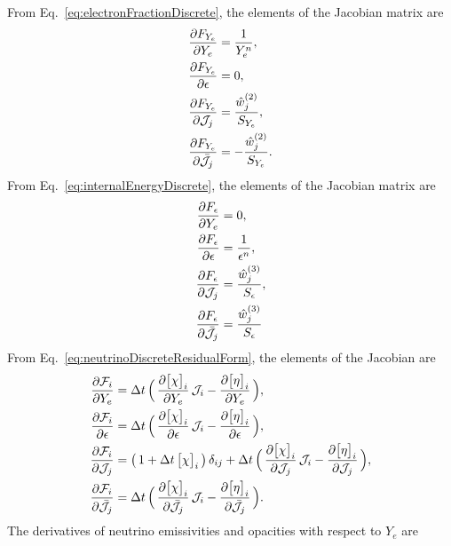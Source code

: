\documentclass[12pt]{article}
\begin{document}
From Eq.~\eqref{eq:electronFractionDiscrete}, the elements of the Jacobian matrix are
\begin{align}
  \frac{\partial F_{Y_{e}}}{\partial Y_{e}}
  &=\frac{1}{Y_{e}^{n}}, \\
  \frac{\partial F_{Y_{e}}}{\partial \epsilon}
  &=0, \\
  \frac{\partial F_{Y_{e}}}{\partial \mathcal{J}_{j}}
  &=\frac{\hat{w}_{j}^{(2)}}{S_{Y_{e}}}, \\
  \frac{\partial F_{Y_{e}}}{\partial \bar{\mathcal{J}}_{j}}
  &=-\frac{\hat{w}_{j}^{(2)}}{S_{Y_{e}}}.  
\end{align}
From Eq.~\eqref{eq:internalEnergyDiscrete}, the elements of the Jacobian matrix are
\begin{align}
  \frac{\partial F_{\epsilon}}{\partial Y_{e}}
  &=0, \\
  \frac{\partial F_{\epsilon}}{\partial \epsilon}
  &=\frac{1}{\epsilon^{n}}, \\
  \frac{\partial F_{\epsilon}}{\partial \mathcal{J}_{j}}
  &=\frac{\hat{w}_{j}^{(3)}}{S_{\epsilon}}, \\
  \frac{\partial F_{\epsilon}}{\partial \bar{\mathcal{J}}_{j}}
  &=\frac{\hat{w}_{j}^{(3)}}{S_{\epsilon}}
\end{align}
From Eq.~\eqref{eq:neutrinoDiscreteResidualForm}, the elements of the Jacobian are
\begin{align}
  \frac{\partial \mathcal{F}_{i}}{\partial Y_{e}}
  &=\Delta t\,\Big(\,\frac{\partial \big[\chi\big]_{i}}{\partial Y_{e}}\,\mathcal{J}_{i}-\frac{\partial \big[\eta\big]_{i}}{\partial Y_{e}}\,\Big), \\
  \frac{\partial \mathcal{F}_{i}}{\partial \epsilon}
  &=\Delta t\,\Big(\,\frac{\partial \big[\chi\big]_{i}}{\partial \epsilon}\,\mathcal{J}_{i}-\frac{\partial \big[\eta\big]_{i}}{\partial \epsilon}\,\Big), \\
  \frac{\partial \mathcal{F}_{i}}{\partial \mathcal{J}_{j}}
  &=\big(\,1+\Delta t\,\big[\chi\big]_{i}\,\big)\,\delta_{ij}
  +\Delta t\,\Big(\,\frac{\partial \big[\chi\big]_{i}}{\partial \mathcal{J}_{j}}\,\mathcal{J}_{i}-\frac{\partial \big[\eta\big]_{i}}{\partial \mathcal{J}_{j}}\,\Big), \\
  \frac{\partial \mathcal{F}_{i}}{\partial \bar{\mathcal{J}}_{j}}
  &=\Delta t\,\Big(\,\frac{\partial \big[\chi\big]_{i}}{\partial \bar{\mathcal{J}}_{j}}\,\mathcal{J}_{i}-\frac{\partial \big[\eta\big]_{i}}{\partial \bar{\mathcal{J}}_{j}}\,\Big).  
\end{align}
The derivatives of neutrino emissivities and opacities with respect to $Y_{e}$ are
\end{document}
